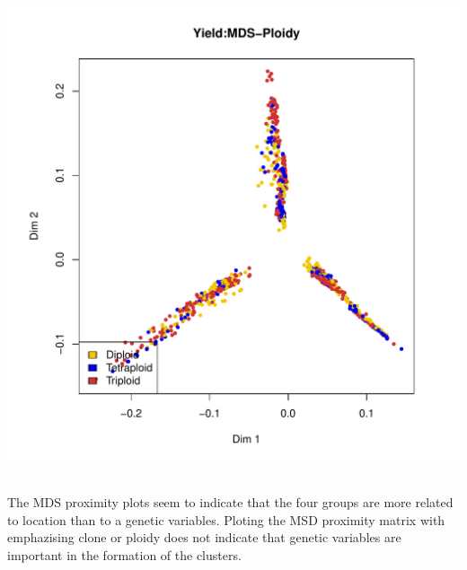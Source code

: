 \documentclass{article}\usepackage[]{graphicx}\usepackage[]{color}
\makeatletter
\def\maxwidth{ %
  \ifdim\Gin@nat@width>\linewidth
    \linewidth
  \else
    \Gin@nat@width
  \fi
}
\newenvironment{knitrout}{}{} %
\makeatother
\begin{document}
\begin{knitrout}
{}




{\centering \includegraphics[width=\maxwidth]{figure/MSDSPlotsYield-3} 

}



\end{knitrout}

\\

The MDS proximity plots seem to indicate that the four groups are more related to location than to a genetic variables. Ploting the MSD proximity matrix with emphazising clone or ploidy does not indicate that genetic variables are important in the formation of the clusters.
\end{document}
